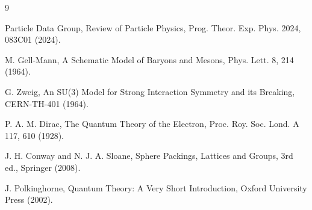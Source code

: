 \documentclass[11pt]{article}
\begin{document}
\begin{thebibliography}{9}

Particle Data Group, Review of Particle Physics, Prog. Theor. Exp. Phys. 2024, 083C01 (2024).

M. Gell-Mann, A Schematic Model of Baryons and Mesons, Phys. Lett. 8, 214 (1964).

G. Zweig, An SU(3) Model for Strong Interaction Symmetry and its Breaking, CERN-TH-401 (1964).

P. A. M. Dirac, The Quantum Theory of the Electron, Proc. Roy. Soc. Lond. A 117, 610 (1928).

J. H. Conway and N. J. A. Sloane, Sphere Packings, Lattices and Groups, 3rd ed., Springer (2008).

J. Polkinghorne, Quantum Theory: A Very Short Introduction, Oxford University Press (2002).

\end{thebibliography}
\end{document}
